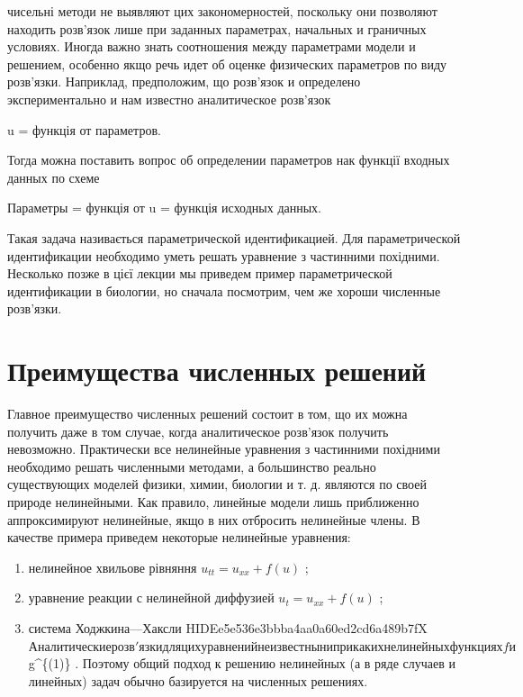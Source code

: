 \documentclass[
  ukrainian,
]{article}
\begin{document}
чисельні методи не выявляют цих закономерностей, поскольку они позволяют
находить розв'язок лише при заданных параметрах, начальных и граничных
условиях. Иногда важно знать соотношения между параметрами модели и
решением, особенно якщо речь идет об оценке физических параметров по
виду розв'язки. Наприклад, предположим, що розв'язок и определено
экспериментально и нам известно аналитическое розв'язок

u = функція от параметров.

Тогда можна поставить вопрос об определении параметров нак функції
входных данных по схеме

Параметры = функція от u = функція исходных данных.

Такая задача називається параметрической идентификацией. Для
параметрической идентификации необходимо уметь решать уравнение з
частинними похідними. Несколько позже в цієї лекции мы приведем пример
параметрической идентификации в биологии, но сначала посмотрим, чем же
хороши численные розв'язки.

\section{Преимущества численных
решений}\label{ux43fux440ux435ux438ux43cux443ux449ux435ux441ux442ux432ux430-ux447ux438ux441ux43bux435ux43dux43dux44bux445-ux440ux435ux448ux435ux43dux438ux439}

Главное преимущество численных решений состоит в том, що их можна
получить даже в том случае, когда аналитическое розв'язок получить
невозможно. Практически все нелинейные уравнения з частинними похідними
необходимо решать численными методами, а большинство реально
существующих моделей физики, химии, биологии и т. д. являются по своей
природе нелинейными. Как правило, линейные модели лишь приближенно
аппроксимируют нелинейные, якщо в них отбросить нелинейные члены. В
качестве примера приведем некоторые нелинейные уравнения:

\begin{enumerate}
\def\labelenumi{\arabic{enumi})}
\item
  нелинейное хвильове рівняння \(u_{tt} = u_{xx} + f(u)\) ;
\item
  уравнение реакции с нелинейной диффузией \(u_t = u_{xx} + f(u)\) ;
\item
  система Ходжкина---Хаксли HIDEe5e536e3bbba4aa0a60ed2cd6a489b7fX
  \(Аналитические розв'язки для цих уравнений не известны ни при каких нелинейных функциях f и\)
  g\^{}\{(1)\} . Поэтому общий подход к решению нелинейных (а в ряде
  случаев и линейных) задач обычно базируется на численных решениях.
\end{enumerate}
\end{document}
